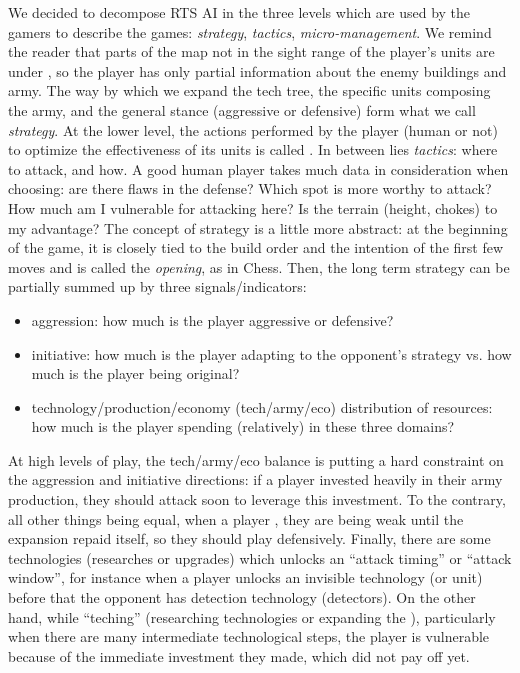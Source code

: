 We decided to decompose RTS AI in the three levels which are used by the gamers to describe the games: \textit{strategy}, \textit{tactics}, \textit{micro-management}. We remind the reader that parts of the map not in the sight range of the player's units are under \textit{}, so the player has only partial information about the enemy buildings and army. The way by which we expand the tech tree, the specific units composing the army, and the general stance (aggressive or defensive) form what we call \textit{strategy}. At the lower level, the actions performed by the player (human or not) to optimize the effectiveness of its units is called \textit{}. In between lies \textit{tactics}: where to attack, and how. A good human player takes much data in consideration when choosing: are there flaws in the defense? Which spot is more worthy to attack? How much am I vulnerable for attacking here? Is the terrain (height, chokes) to my advantage? The concept of strategy is a little more abstract: at the beginning of the game, it is closely tied to the build order and the intention of the first few moves and is called the \textit{opening}, as in Chess. Then, the long term strategy can be partially summed up by three signals/indicators:
\begin{itemize}
    \item aggression: how much is the player aggressive or defensive?
    \item initiative: how much is the player adapting to the opponent's strategy vs. how much is the player being original?
    \item technology/production/economy (tech/army/eco) distribution of resources: how much is the player spending (relatively) in these three domains?
\end{itemize}
At high levels of play, the tech/army/eco balance is putting a hard constraint on the aggression and initiative directions: if a player invested heavily in their army production, they should attack soon to leverage this investment. To the contrary, all other things being equal, when a player , they are being weak until the expansion repaid itself, so they should play defensively. Finally, there are some technologies (researches or upgrades) which unlocks an ``attack timing'' or ``attack window'', for instance when a player unlocks an invisible technology (or unit) before that the opponent has detection technology (detectors). On the other hand, while ``teching'' (researching technologies or expanding the ), particularly when there are many intermediate technological steps, the player is vulnerable because of the immediate investment they made, which did not pay off yet.

